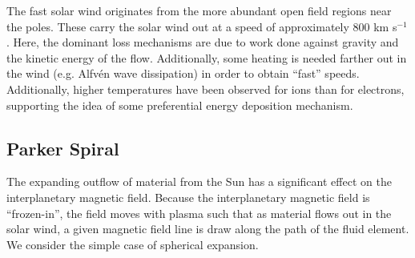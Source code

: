 	The fast solar wind originates from the more abundant open field regions near the poles. These carry the solar wind out at a speed of approximately 800 km s$^{-1}$. Here, the dominant loss mechanisms are due to work done against gravity and the kinetic energy of the flow. Additionally, some heating is needed farther out in the wind (e.g. Alfv\'en wave dissipation) in order to obtain ``fast'' speeds. Additionally, higher temperatures have been observed for ions than for electrons, supporting the idea of some preferential energy deposition mechanism.
	
	\subsection{Parker Spiral}
	The expanding outflow of material from the Sun has a significant effect on the interplanetary magnetic field. Because the interplanetary magnetic field is ``frozen-in'', the field moves with plasma such that as material flows out in the solar wind, a given magnetic field line is draw along the path of the fluid element. We consider the simple case of spherical expansion.
	
